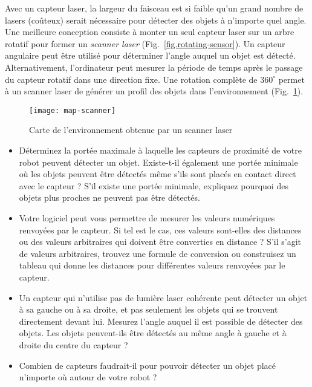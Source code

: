 Avec un capteur laser, la largeur du faisceau est si faible qu'un grand nombre de lasers (coûteux) serait nécessaire pour détecter des objets à n'importe quel angle. Une meilleure conception consiste à monter un seul capteur laser sur un arbre rotatif pour former un \emph{scanner laser} (Fig.~\ref{fig.rotating-sensor}). Un capteur angulaire peut être utilisé pour déterminer l'angle auquel un objet est détecté. Alternativement, l'ordinateur peut mesurer la période de temps après le passage du capteur rotatif dans une direction fixe. Une rotation complète de $360^\circ{}$ permet à un scanner laser de générer un profil des objets dans l'environnement (Fig.~\ref{fig.laser-scanner}).

\begin{figure}
\begin{center}
\texttt{[image: map-scanner]}
\end{center}
\caption{Carte de l'environnement obtenue par un scanner laser}\label{fig.laser-scanner}
\end{figure}

\begin{framed}

\begin{itemize}
\item Déterminez la portée maximale à laquelle les capteurs de proximité de votre robot peuvent détecter un objet. Existe-t-il également une portée minimale où les objets peuvent être détectés même s'ils sont placés en contact direct avec le capteur ? S'il existe une portée minimale, expliquez pourquoi des objets plus proches ne peuvent pas être détectés.
\item Votre logiciel peut vous permettre de mesurer les valeurs numériques renvoyées par le capteur. Si tel est le cas, ces valeurs sont-elles des distances ou des valeurs arbitraires qui doivent être converties en distance ? S'il s'agit de valeurs arbitraires, trouvez une formule de conversion ou construisez un tableau qui donne les distances pour différentes valeurs renvoyées par le capteur.
\item Un capteur qui n'utilise pas de lumière laser cohérente peut détecter un objet à sa gauche ou à sa droite, et pas seulement les objets qui se trouvent directement devant lui. Mesurez l'angle auquel il est possible de détecter des objets. Les objets peuvent-ils être détectés au même angle à gauche et à droite du centre du capteur ?
\item Combien de capteurs faudrait-il pour pouvoir détecter un objet placé n'importe où autour de votre robot ?

\end{itemize}
\end{framed}

